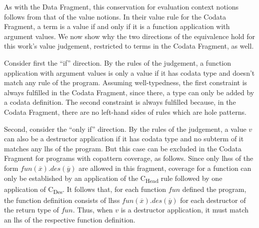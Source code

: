 As with the Data Fragment, this conservation for evaluation context notions follows from that of the value notions. In their value rule for the Codata Fragment, a term is a value if and only if it is a function application with argument values. We now show why the two directions of the equivalence hold for this work's value judgement, restricted to terms in the Codata Fragment, as well.

Consider first the ``if'' direction. By the rules of the judgement, a function application with argument values is only a value if it has codata type and doesn't match any rule of the program. Assuming well-typedness, the first constraint is always fulfilled in the Codata Fragment, since there, a type can only be added by a codata definition. The second constraint is always fulfilled because, in the Codata Fragment, there are no left-hand sides of rules which are hole patterns.

Second, consider the ``only if'' direction. By the rules of the judgement, a value $v$ can also be a destructor application if it has codata type and no subterm of it matches any lhs of the program. But this case can be excluded in the Codata Fragment for programs with copattern coverage, as follows. Since only lhss of the form $fun(\overline{x}).des(\overline{y})$ are allowed in this fragment, coverage for a function can only be established by an application of the C\textsubscript{Head} rule followed by one application of C\textsubscript{Des}. It follows that, for each function $fun$ defined the program, the function definition consists of lhss $fun(\overline{x}).des(\overline{y})$ for each destructor of the return type of $fun$. Thus, when $v$ is a destructor application, it must match an lhs of the respective function definition.

